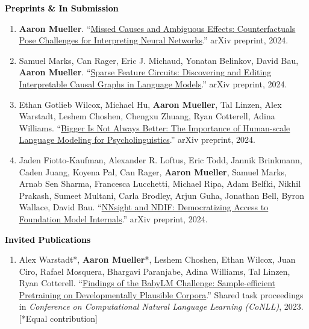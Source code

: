 \documentclass[10pt]{article}
\renewcommand{\subsection}[1]{\textcolor{black}{#1}}
\newcommand{\halfblankline}{\quad\vspace{-0.5\baselineskip}\pagebreak[3]}
\providecommand*\titlelink[2]{\href{#1}{\textcolor{accent}{#2}}}
\begin{document}
	\subsection{\textbf{Preprints \& In Submission}}
	\begin{enumerate}[resume, leftmargin=*, topsep=0pt, itemsep=0.25ex, partopsep=0ex, parsep=1ex]

	\item \textbf{Aaron Mueller}. ``\titlelink{https://arxiv.org/abs/2407.04690v1}{Missed Causes and Ambiguous Effects: Counterfactuals Pose Challenges for Interpreting Neural Networks}.'' arXiv preprint, 2024.

	\item Samuel Marks, Can Rager, Eric J. Michaud, Yonatan Belinkov, David Bau, \textbf{Aaron Mueller}. ``\titlelink{https://arxiv.org/abs/2403.19647}{Sparse Feature Circuits: Discovering and Editing Interpretable Causal Graphs in Language Models}.'' arXiv preprint, 2024.\label{pub:feature-circuits}
	
	\item Ethan Gotlieb Wilcox, Michael Hu, \textbf{Aaron Mueller}, Tal Linzen, Alex Warstadt, Leshem Choshen, Chengxu Zhuang, Ryan Cotterell, Adina Williams. ``\titlelink{https://osf.io/preprints/psyarxiv/rfwgd}{Bigger Is Not Always Better: The Importance of Human-scale Language Modeling for Psycholinguistics}.'' arXiv preprint, 2024.
	
	\item Jaden Fiotto-Kaufman, Alexander R. Loftus, Eric Todd, Jannik Brinkmann, Caden Juang, Koyena Pal, Can Rager, \textbf{Aaron Mueller}, Samuel Marks, Arnab Sen Sharma, Francesca Lucchetti, Michael Ripa, Adam Belfki, Nikhil Prakash, Sumeet Multani, Carla Brodley, Arjun Guha, Jonathan Bell, Byron Wallace, David Bau. ``\titlelink{https://arxiv.org/abs/2407.14561v1}{NNsight and NDIF: Democratizing Access to Foundation Model Internals}.'' arXiv preprint, 2024.


	\end{enumerate}

	\halfblankline

	\subsection{\textbf{Invited Publications}}
	
	\begin{enumerate}[resume, leftmargin=*, topsep=0pt, itemsep=0.25ex, partopsep=0ex, parsep=1ex]
	\item Alex Warstadt*, \textbf{Aaron Mueller}*, Leshem Choshen, Ethan Wilcox, Juan Ciro, Rafael Mosquera, Bhargavi Paranjabe, Adina Williams, Tal Linzen, Ryan Cotterell. ``\titlelink{https://arxiv.org/abs/2301.11796}{Findings of the BabyLM Challenge: Sample-efficient Pretraining on Developmentally Plausible Corpora}.'' Shared task proceedings in \emph{Conference on Computational Natural Language Learning (CoNLL)}, 2023. [*Equal contribution]
	\end{enumerate}
\end{document}
